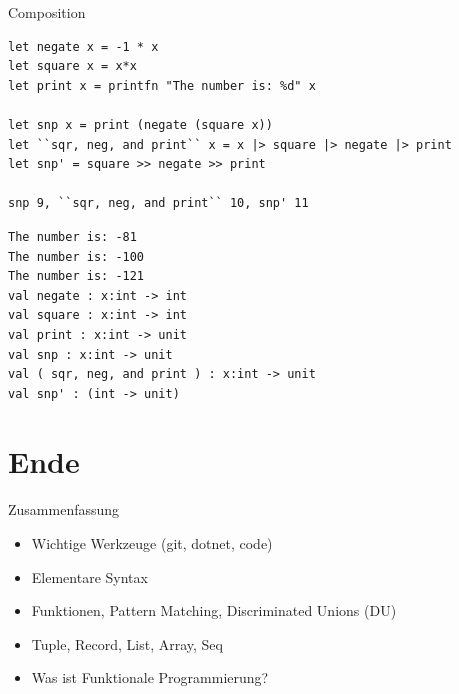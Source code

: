 \documentclass[t]{beamer}
\begin{document}
\begin{frame}[label={sec:org28a7570},fragile]{Composition}
 \scriptsize

\begin{verbatim}
let negate x = -1 * x
let square x = x*x
let print x = printfn "The number is: %d" x

let snp x = print (negate (square x))
let ``sqr, neg, and print`` x = x |> square |> negate |> print
let snp' = square >> negate >> print

snp 9, ``sqr, neg, and print`` 10, snp' 11
\end{verbatim}

\begin{verbatim}
The number is: -81
The number is: -100
The number is: -121
val negate : x:int -> int
val square : x:int -> int
val print : x:int -> unit
val snp : x:int -> unit
val ( sqr, neg, and print ) : x:int -> unit
val snp' : (int -> unit)
\end{verbatim}
\end{frame}


\section{Ende }
\label{sec:orgb7c34d2}

\begin{frame}[label={sec:org198297f}]{Zusammenfassung}
\begin{itemize}
\item Wichtige Werkzeuge (git, dotnet, code)
\item Elementare Syntax
\item Funktionen, Pattern Matching, Discriminated Unions (DU)
\item Tuple, Record, List, Array, Seq
\item Was ist Funktionale Programmierung?
\end{itemize}
\end{frame}
\end{document}
